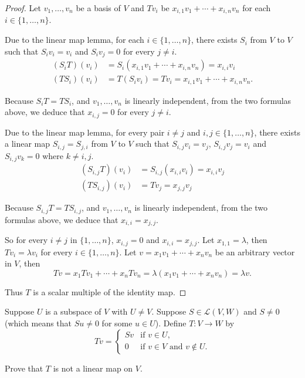 \begin{proof}
    Let $v_{1}, \ldots, v_{n}$ be a basis of $V$ and $Tv_{i}$ be $x_{i,1}v_{1} + \cdots + x_{i,n}v_{n}$ for each $i\in\{ 1, \ldots, n \}$.

    Due to the linear map lemma, for each $i\in \{ 1, \ldots, n \}$, there exists $S_{i}$ from $V$ to $V$ such that $S_{i}v_{i} = v_{i}$ and $S_{i}v_{j} = 0$ for every $j\ne i$.
    \begin{align*}
        (S_{i}T)(v_{i}) & = S_{i}(x_{i,1}v_{1} + \cdots + x_{i,n}v_{n}) = x_{i,i}v_{i}     \\
        (TS_{i})(v_{i}) & = T(S_{i}v_{i}) = Tv_{i} = x_{i,1}v_{1} + \cdots + x_{i,n}v_{n}.
    \end{align*}

    Because $S_{i}T = TS_{i}$, and $v_{1}, \ldots, v_{n}$ is linearly independent, from the two formulas above, we deduce that $x_{i,j} = 0$ for every $j\ne i$.

    Due to the linear map lemma, for every pair $i\ne j$ and $i, j\in \{ 1, \ldots, n \}$, there exists a linear map $S_{i,j} = S_{j,i}$ from $V$ to $V$ such that $S_{i,j}v_{i} = v_{j}$, $S_{i,j}v_{j} = v_{i}$ and $S_{i,j}v_{k} = 0$ where $k\ne i, j$.
    \begin{align*}
        (S_{i,j}T)(v_{i}) & = S_{i,j}(x_{i,i}v_{i}) = x_{i,i}v_{j} \\
        (TS_{i,j})(v_{i}) & = Tv_{j} = x_{j,j}v_{j}
    \end{align*}

    Because $S_{i,j}T = TS_{i,j}$, and $v_{1}, \ldots, v_{n}$ is linearly independent, from the two formulas above, we deduce that $x_{i,i} = x_{j,j}$.

    So for every $i\ne j$ in $\{1, \ldots, n\}$, $x_{i,j} = 0$ and $x_{i,i} = x_{j,j}$. Let $x_{1,1} = \lambda$, then $Tv_{i} = \lambda v_{i}$ for every $i\in\{1, \ldots, n\}$. Let $v = x_{1}v_{1} + \cdots + x_{n}v_{n}$ be an arbitrary vector in $V$, then
    \[
        Tv = x_{1}Tv_{1} + \cdots + x_{n}Tv_{n} = \lambda (x_{1}v_{1} + \cdots + x_{n}v_{n}) = \lambda v.
    \]

    Thus $T$ is a scalar multiple of the identity map.
\end{proof}
\newpage

\begin{exercise}
    Suppose $U$ is a subspace of $V$ with $U\ne V$. Suppose $S\in \mathcal{L}(V, W)$ and $S \ne 0$ (which means that $Su \ne 0$ for some $u \in U$). Define $T : V \to W$ by
    \[
        Tv = \begin{cases}
            Sv & \text{if $v\in U$},                 \\
            0  & \text{if $v\in V$ and $v\notin U$.}
        \end{cases}
    \]

    Prove that $T$ is not a linear map on $V$.
\end{exercise}

